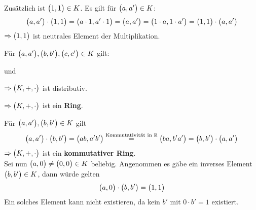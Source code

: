 \documentclass{scrreprt}
\begin{document}
\begin{enumerate}[(1)]
  Zusätzlich ist $\qty\big(1, 1) \in K$.
  Es gilt für $\qty\big(a, a') \in K$:
  \[
    \qty\big(a, a') \cdot \qty\big(1, 1)
    = \qty\big(a \cdot 1, a' \cdot 1)
    = \qty\big(a, a')
    = \qty\big(1 \cdot a, 1 \cdot a')
    = \qty\big(1, 1) \cdot \qty\big(a, a')
  \]
  $\Rightarrow \qty\big(1, 1)$ ist neutrales Element der Multiplikation.

  \newpage
  Für $\qty\big(a, a'), \qty\big(b, b'), \qty\big(c, c') \in K$ gilt:
  und
  $\Rightarrow \qty\big(K, +, \cdot)$ ist distributiv.

  $\Rightarrow \qty\big(K, +, \cdot)$ ist ein \textbf{Ring}.

  Für $\qty\big(a, a'), \qty\big(b, b') \in K$ gilt
  \[
    \qty\big(a, a') \cdot \qty\big(b, b')
    = \qty\big(ab, a'b')
    \overset{\text{Kommutativität in $\mathbb{R}$}}= \qty\big(ba, b'a')
    = \qty\big(b, b') \cdot \qty\big(a, a')
  \]
  $\Rightarrow \qty\big(K, +, \cdot)$ ist ein \textbf{kommutativer Ring}. \\

  Sei nun $\qty\big(a, 0) \ne \qty\big(0, 0) \in K$ beliebig.
  Angenommen es gäbe ein inverses Element $\qty\big(b, b') \in K$, dann
  würde gelten
  \[
    \qty\big(a, 0) \cdot \qty\big(b, b') = \qty\big(1, 1)
  \]
  Ein solches Element kann nicht existieren, da kein $b'$ mit
  $0 \cdot b' = 1$ existiert.


\end{enumerate}
\end{document}
